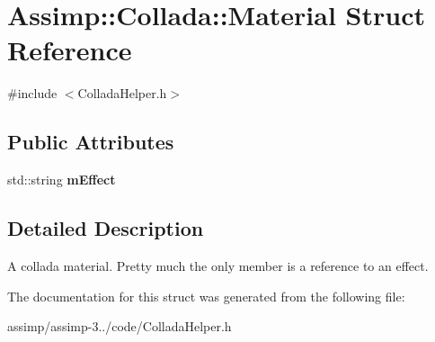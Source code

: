 \hypertarget{struct_assimp_1_1_collada_1_1_material}{\section{Assimp\+:\+:Collada\+:\+:Material Struct Reference}
\label{struct_assimp_1_1_collada_1_1_material}
}


{\ttfamily \#include $<$Collada\+Helper.\+h$>$}

\subsection*{Public Attributes}
\begin{DoxyCompactItemize}
\item 
\hypertarget{struct_assimp_1_1_collada_1_1_material_ac977b432ba7ad1ee7cccd6952da0ea06}{std\+::string {\bfseries m\+Effect}}\label{struct_assimp_1_1_collada_1_1_material_ac977b432ba7ad1ee7cccd6952da0ea06}

\end{DoxyCompactItemize}


\subsection{Detailed Description}
A collada material. Pretty much the only member is a reference to an effect. 

The documentation for this struct was generated from the following file\+:\begin{DoxyCompactItemize}
\item 
assimp/assimp-\/3../code/Collada\+Helper.\+h\end{DoxyCompactItemize}
